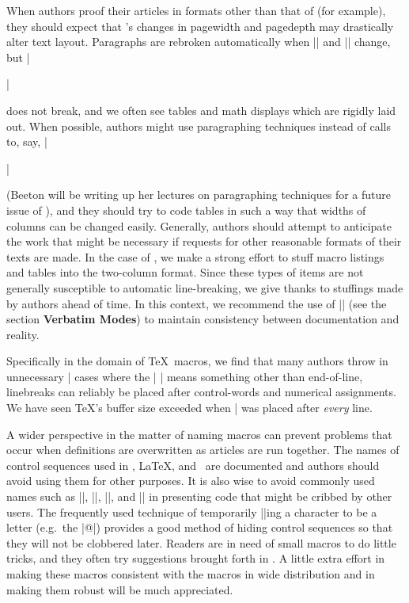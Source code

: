 When authors proof their articles in formats other than that of \TUB\/
(for example), they should expect that \TUB's changes in pagewidth and
pagedepth may drastically alter text layout.  Paragraphs are rebroken
automatically when |\hsize| and |\vsize| change, but |\centerline|
does not break, and we often see tables and math displays which are
rigidly laid out.  When possible, authors might use paragraphing
techniques instead of calls to, say, |\centerline| (Beeton will be
writing up her lectures on paragraphing techniques for a future issue
of \TUB\/), and they should try to code tables in such a way that
widths of columns can be changed easily.  Generally, authors should
attempt to anticipate the work that might be necessary if requests for
other reasonable formats of their texts are made.  In the case of
\TUB, we make a strong effort to stuff macro listings and tables into
the two-column format.  Since these types of items are not generally
susceptible to automatic line-breaking, we give thanks to stuffings
made by authors ahead of time.  In this context, we recommend the use
of || (see the section {\bf Verbatim Modes}) to maintain
consistency between documentation and reality.

Specifically in the domain of \TeX\ macros, we find that many authors
throw in unnecessary |%
cases where the |^^M| means something other than end-of-line,
linebreaks can reliably be placed after control-words and numerical
assignments.  We have seen \TeX's buffer size exceeded when |%
was placed after {\it every\/} line.

A wider perspective in the matter of naming macros can prevent
problems that occur when definitions are overwritten as articles are
run together.  The names of control sequences used in \plain, \LaTeX,
and \AmSTeX\ are documented and authors should avoid using them for
other purposes.  It is also wise to avoid commonly used names such as
|\temp|, |\result|, |\1|, and |\mac| in presenting code that might be
cribbed by other users.  The frequently used technique of temporarily
|\catcode|ing a character to be a letter (e.g.\ the |@|) provides a
good method of hiding control sequences so that they will not be
clobbered later.  Readers are in need of small macros to do little
tricks, and they often try suggestions brought forth in \TUB.  A
little extra effort in making these macros consistent with the macros
in wide distribution and in making them robust will be much
appreciated.



